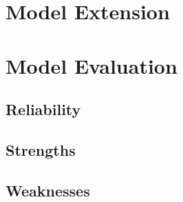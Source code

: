 \documentclass{mcmthesis}  %
\begin{document}
	\section{Model Extension}  %
	
	\section{Model Evaluation}  %
	\subsection{Reliability}
	\subsection{Strengths}
	\subsection{Weaknesses}
	
\end{document}
